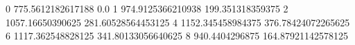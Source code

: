 0 775.5612182617188 0.0
1 974.9125366210938 199.351318359375
2 1057.16650390625 281.60528564453125
4 1152.345458984375 376.78424072265625
6 1117.362548828125 341.80133056640625
8 940.4404296875 164.87921142578125
